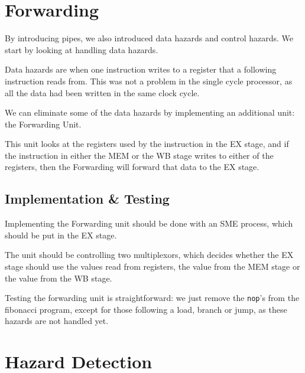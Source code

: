 \documentclass{beamer}
\begin{document}
\section{Forwarding}
\begin{frame}
    By introducing pipes, we also introduced data hazards and control hazards.
    We start by looking at handling data hazards.

    \vspace{\baselineskip}
    Data hazards are when one instruction writes to a register that a following
    instruction reads from. This was not a problem in the single cycle
    processor, as all the data had been written in the same clock cycle.
\end{frame}
\begin{frame}
    We can eliminate some of the data hazards by implementing an additional
    unit: the Forwarding Unit.

    \vspace{\baselineskip}
    This unit looks at the registers used by the instruction in the EX stage,
    and if the instruction in either the MEM or the WB stage writes to either
    of the registers, then the Forwarding will forward that data to the EX
    stage.
\end{frame}

\subsection{Implementation \& Testing}
\begin{frame}
    Implementing the Forwarding unit should be done with an SME process, which
    should be put in the EX stage.

    \vspace{\baselineskip}
    The unit should be controlling two multiplexors, which decides whether the
    EX stage should use the values read from registers, the value from the MEM
    stage or the value from the WB stage.

    \vspace{\baselineskip}
    Testing the forwarding unit is straightforward: we just remove the
    \texttt{nop}'s from the fibonacci program, except for those following a
    load, branch or jump, as these hazards are not handled yet.
\end{frame}

\section{Hazard Detection}
\end{document}
